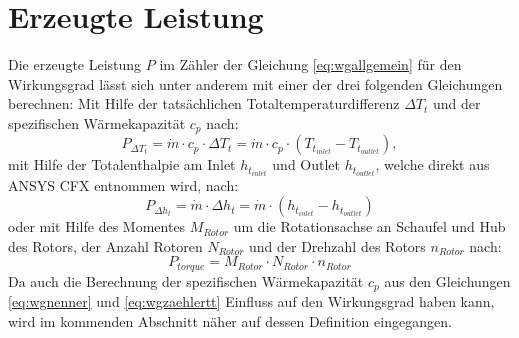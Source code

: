 \section{Erzeugte Leistung}
\label{sec:wirkungsgrade}
Die erzeugte Leistung $P$ im Zähler der Gleichung \ref{eq:wgallgemein} für den Wirkungsgrad  lässt sich unter anderem mit einer der drei folgenden Gleichungen berechnen:\newline
Mit Hilfe der tatsächlichen Totaltemperaturdifferenz $\Delta T_t$ und der spezifischen Wärmekapazität $c_p$ nach:
\begin{equation}
\label{eq:wgzaehlertt}
P_{\Delta T_t} = \dot m \cdot c_p \cdot \Delta T_t = \dot m \cdot c_p \cdot \left( T_{t_{inlet}}-T_{t_{outlet}} \right),
\end{equation}
mit Hilfe der Totalenthalpie am Inlet $h_{t_{inlet}}$ und Outlet $h_{t_{outlet}}$, welche direkt aus ANSYS CFX entnommen wird, nach:
\begin{equation}
\label{eq:wgzaehlerht}
P_{\Delta h_t} = \dot m \cdot \Delta h_t = \dot m \cdot \left( h_{t_{inlet}}-h_{t_{outlet}} \right)
\end{equation}
oder mit Hilfe des Momentes $M_{Rotor}$ um die Rotationsachse an Schaufel und Hub des Rotors, der Anzahl Rotoren $N_{Rotor}$ und der Drehzahl des Rotors $n_{Rotor}$ nach:
\begin{equation}
\label{eq:wgzaehlertorque}
P_{torque} = M_{Rotor} \cdot N_{Rotor} \cdot n_{Rotor}
\end{equation}
Da auch die Berechnung der spezifischen Wärmekapazität $c_p$ aus den Gleichungen \ref{eq:wgnenner} und \ref{eq:wgzaehlertt} Einfluss auf den Wirkungsgrad haben kann, wird im kommenden Abschnitt näher auf dessen Definition eingegangen.

